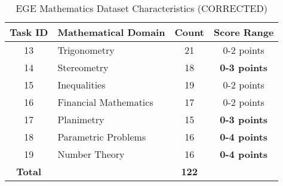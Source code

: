 \documentclass{article}
\begin{document}
\begin{table}[htbp]
\centering
\caption{EGE Mathematics Dataset Characteristics (CORRECTED)}
\label{tab:dataset_characteristics_corrected}
\begin{tabular}{@{}clcc@{}}
\toprule
\textbf{Task ID} & \textbf{Mathematical Domain} & \textbf{Count} & \textbf{Score Range} \\
\midrule
13 & Trigonometry & 21 & 0-2 points \\
14 & Stereometry & 18 & \textbf{0-3 points} \\
15 & Inequalities & 19 & 0-2 points \\
16 & Financial Mathematics & 17 & 0-2 points \\
17 & Planimetry & 15 & \textbf{0-3 points} \\
18 & Parametric Problems & 16 & \textbf{0-4 points} \\
19 & Number Theory & 16 & \textbf{0-4 points} \\
\midrule
\textbf{Total} & & \textbf{122} & \\
\bottomrule
\end{tabular}
\end{table}
\end{document}
